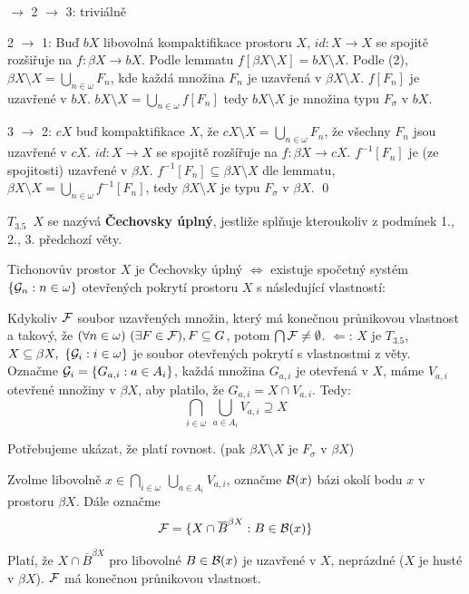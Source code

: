 \documentclass[12pt,a4paper]{article}
\newcommand\BX{\ensuremath{\beta X}}
\newcommand\Tich{$T_{3.5}$\xspace}
\newcommand\close{\overline}
\newcommand{\betaClose}[1]{\close #1 ^{\beta X}}
\begin{document}
 $\rightarrow$ 2 $\rightarrow$ 3: triviálně

2 $\rightarrow$ 1: Buď $bX$ libovolná kompaktifikace prostoru $X$, $id: X \to
	X$ se spojitě rozšiřuje na $f : \beta X \to bX$. Podle lemmatu $f[\BX
	\setminus X] = bX \setminus X$. Podle (2), $\BX \setminus X = \bigcup_{n
	\in \omega} F_n$, kde každá množina $F_n$ je uzavřená v $\BX \setminus X$.
	$f[F_n]$ je uzavřené v $bX$. $bX \setminus X = \bigcup_{n \in \omega}
	f[F_n]$ tedy $bX \setminus X$ je množina typu $F_\sigma$ v $bX$.

3 $\rightarrow$ 2: $cX$ buď kompaktifikace $X$, že $cX \setminus X = \bigcup_{n
	\in \omega} F_n$, že všechny $F_n$ jsou uzavřené v $cX$. $id : X \to X$ se
	spojitě rozšířuje na $f : \BX \to cX$. $f^{-1}[F_n]$ je (ze spojitosti)
	uzavřené v \BX. $f^{-1}[F_n] \subseteq \beta X \setminus X$ dle lemmatu,
	$\BX \setminus X = \bigcup_{n \in \omega} f^{-1}[F_n]$, tedy $\beta X
	\setminus X$ je typu $F_\sigma$ v \BX.
\qed

 \Tich~$X$ se nazývá {\bf Čechovsky úplný}, jestliže splňuje
	kteroukoliv z podmínek 1., 2., 3. předchozí věty.

\veta Tichonovův prostor $X$ je Čechovsky úplný $\iff$ existuje spočetný systém
	$\{\mathcal{ G }_n: n \in \omega\}$ otevřených pokrytí prostoru $X$ s následující
	vlastností:

	Kdykoliv $\mathcal{ F }$ soubor uzavřených množin, který má konečnou průnikovou
	vlastnost a takový, že $(\forall n \in \omega)~(\exists F \in \mathcal{ F }), F
	\subseteq G$, potom $\bigcap \mathcal{ F } \neq \emptyset$.
\dukaz
\noindent$\Leftarrow$: $X$ je \Tich,~$X \subseteq \beta X,~\{\mathcal{ G }_i : i \in
	\omega \}$ je soubor otevřených pokrytí s vlastnostmi z věty. Označme $\mathcal{ G }_i = \{G_{a,i} : a \in A_i\}$, každá množina $G_{a,i}$ je otevřená v $X$,
	máme $V_{a,i}$ otevřené množiny v \BX, aby platilo, že $G_{a,i} = X \cap
	V_{a,i}$. Tedy:
		$$\bigcap_{i \in \omega}~\bigcup_{a \in A_i} V_{a,i} \supseteq X$$
	
	Potřebujeme ukázat, že platí rovnost. (pak $\beta X \setminus X$ je
	$F_\sigma$ v \BX)

	Zvolme libovolně $x \in \bigcap_{i \in \omega}~\bigcup_{a \in A_i}
	V_{a,i}$, označme $\mathcal{ B }(x)$ bázi okolí bodu $x$ v prostoru \BX. Dále
	označme
		$$\p F = \{X \cap \betaClose B : B \in \p B(x)\}$$
	
	Platí, že $X \cap \betaClose B$ pro libovolné $B \in \mathcal{ B }(x)$ je
	uzavřené v $X$, neprázdné ($X$ je husté v \BX). $\mathcal{ F }$ má konečnou
	průnikovou vlastnost.
\end{document}
